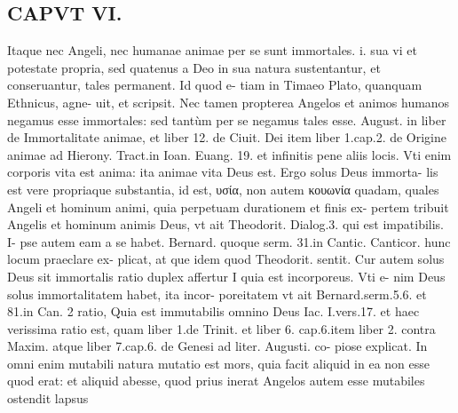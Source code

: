\documentclass{article}
\begin{document}
\begin{pages}
\section*{CAPVT  VI. }
\marginpar{[ p.485 ]}\pstart Itaque nec Angeli, nec humanae animae per se sunt immortales. i. sua vi et potestate propria, sed quatenus a Deo in sua natura sustentantur, et conseruantur, tales permanent. Id quod e- tiam in Timaeo Plato, quanquam Ethnicus, agne- uit, et scripsit. Nec tamen propterea Angelos et animos humanos negamus esse immortales: sed tantùm per se negamus tales esse. August. in liber  de Immortalitate animae, et liber  12. de Ciuit. Dei item liber 1.cap.2. de Origine animae ad Hierony. Tract.in Ioan. Euang. 19. et infinitis pene aliis locis. Vti enim corporis vita est anima: ita animae vita Deus est. Ergo solus Deus immorta- lis est vere propriaque substantia, id est, υσία, non autem κουωνία quadam, quales Angeli et hominum animi, quia perpetuam durationem et finis ex- pertem tribuit Angelis et hominum animis Deus, vt ait Theodorit. Dialog.3. qui est impatibilis. I- pse autem eam a se habet. Bernard. quoque serm. 31.in Cantic. Canticor. hunc locum praeclare ex- plicat, at que idem quod Theodorit. sentit.  \pend\pstart Cur autem solus Deus sit immortalis ratio duplex affertur I quia est incorporeus. Vti e- nim Deus solus immortalitatem habet, ita incor- poreitatem vt ait Bernard.serm.5.6. et 81.in Can. 2 ratio, Quia est immutabilis omnino Deus Iac. I.vers.17. et haec verissima ratio est, quam liber  1.de Trinit. et liber 6. cap.6.item liber 2. contra Maxim. atque liber 7.cap.6. de Genesi ad liter. Augusti. co- piose explicat. In omni enim mutabili natura mutatio est mors, quia facit aliquid in ea non esse quod erat: et aliquid abesse, quod prius inerat Angelos autem esse mutabiles ostendit lapsus  \pend

\end{pages}
\end{document}

